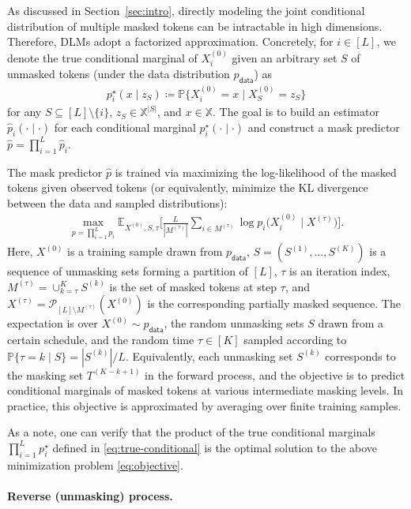 \documentclass[english]{article}
\newcommand{\defn}{\coloneqq}
\newcommand{\cP}{\mathcal{P}}
\newcommand{\bP}{\mathbb{P}}
\newcommand{\bX}{\mathbb{X}}
\newcommand{\wh}{\widehat}
\newcommand{\data}{\mathsf{data}}
\newcommand{\E}{\mathbb{E}}
\begin{document}
As discussed in Section~\ref{sec:intro}, directly modeling the joint conditional distribution of multiple masked tokens can be intractable in high dimensions. Therefore, DLMs adopt a factorized approximation. 
Concretely, for $i\in[L]$, we denote the true conditional marginal of $X_i^{(0)}$ given an arbitrary set $S$ of unmasked tokens (under the data distribution $p_\data$) as
\begin{align}\label{eq:true-conditional}
    p^\star_{i}( x\mid z_S) \defn \bP \big\{X^{(0)}_i =  x\mid X^{(0)}_S = z_S\big\}
\end{align}
for any $S \subseteq [L] \setminus \{i\}$, $z_S\in \bX^{|S|}$, and $x\in \bX$.
The goal is to build an estimator $\wh p_{i}(\cdot \mid \cdot)$ for each conditional marginal $p^\star_i(\cdot \mid \cdot)$ and construct a mask predictor $\wh p = \prod_{i=1}^L\wh p_{i}$.

The mask predictor $\wh p$ is trained via maximizing the log-likelihood of the masked tokens given observed tokens (or equivalently, minimize the KL divergence between the data and sampled distributions):
\begin{align} \label{eq:objective}
\max_{p = \prod_{i=1}^L p_i
} \E_{X^{(0)}, S,\tau}\Bigg[\frac{L}{|M^{(\tau)}|}\sum_{i\in M^{(\tau)}} \log p_i\big(X^{(0)}_{i} \mid X^{(\tau)} \big)\Bigg].
\end{align}
Here, $X^{(0)}$ is a training sample drawn from $p_\data$, $S = (S^{(1)},\dots,S^{(K)})$ is a sequence of unmasking sets  forming a partition of $[L]$, $\tau$ is an iteration index, $M^{(\tau)} = \cup_{k=\tau}^K S^{(k)}$ is the set of masked tokens at step $\tau$, and $X^{(\tau)} = \cP_{[L]\setminus M^{(\tau)}}(X^{(0)})$ is the corresponding partially masked sequence. The expectation is over $X^{(0)}\sim p_\data$, the random unmasking sets $S$ drawn from a certain schedule, and the random time $\tau\in[K]$ sampled according to $\bP\{\tau = k \mid S \} = |S^{(k)}|/L$. 
Equivalently, each unmasking set $S^{(k)}$ corresponds to the masking set $T^{(K-k+1)}$ in the forward process, and the objective is to predict conditional marginals of masked tokens at various intermediate masking levels.
In practice, this objective is approximated by averaging over finite training samples.

As a note, one can verify that the product  of the true conditional marginals $\prod_{i=1}^L p^\star_i$ defined in \eqref{eq:true-conditional} is the optimal solution to the above minimization problem \eqref{eq:objective}.

\paragraph{Reverse (unmasking) process.}
\end{document}
